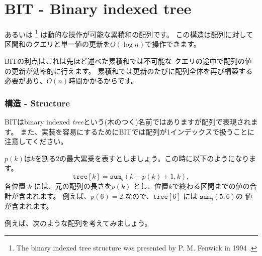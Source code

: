 \section{BIT - Binary indexed tree}


 あるいは \footnote{The
binary indexed tree structure was presented by P. M. Fenwick in 1994 \cite{fen94}.}
は動的な操作が可能な累積和の配列です。
この構造は配列に対して区間和のクエリと単一値の更新を$O(\log n)$で操作できます。

BITの利点はこれは先ほど述べた累積和では不可能な
クエリの途中で配列の値の更新が効率的に行えます。
累積和では更新のたびに配列全体を再び構築する必要があり、$O(n)$時間かかるからです。

\subsubsection{構造 - Structure}

BITはbinary indexed \emph{tree}という(木のつく)名前ではありますが配列で表現されます。
また、実装を容易にするためにBITでは配列が1インデックスで扱うことに注意してください。

$p(k)$は$k$を割る2の最大累乗を表すとしましょう。この時に以下のようになります。
\[ \texttt{tree}[k] = \texttt{sum}_q(k-p(k)+1,k),\]
各位置 $k$ には、元の配列の長さを$p(k)$ とし、位置$k$で終わる区間までの値の合計が含まれます。
例えば、$p(6) = 2$ なので、$\texttt{tree}[6]$ には 
$\texttt{sum}_q(5,6)$の 値が含まれます。

例えば、次のような配列を考えてみましょう。
\begin{center}
\end{center}

